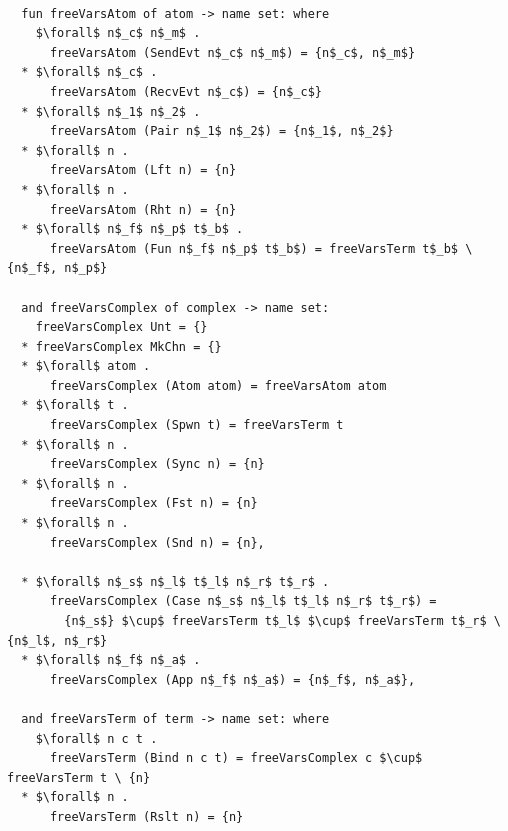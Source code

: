 \documentclass[letterpaper, 11pt]{extarticle}
\begin{document}
\begin{lstlisting}[language=logic, mathescape]

  fun freeVarsAtom of atom -> name set: where
    $\forall$ n$_c$ n$_m$ .
      freeVarsAtom (SendEvt n$_c$ n$_m$) = {n$_c$, n$_m$}
  * $\forall$ n$_c$ .
      freeVarsAtom (RecvEvt n$_c$) = {n$_c$}
  * $\forall$ n$_1$ n$_2$ .
      freeVarsAtom (Pair n$_1$ n$_2$) = {n$_1$, n$_2$}
  * $\forall$ n .
      freeVarsAtom (Lft n) = {n}
  * $\forall$ n .
      freeVarsAtom (Rht n) = {n}
  * $\forall$ n$_f$ n$_p$ t$_b$ .
      freeVarsAtom (Fun n$_f$ n$_p$ t$_b$) = freeVarsTerm t$_b$ \ {n$_f$, n$_p$}
  
  and freeVarsComplex of complex -> name set:
    freeVarsComplex Unt = {}
  * freeVarsComplex MkChn = {}
  * $\forall$ atom .
      freeVarsComplex (Atom atom) = freeVarsAtom atom
  * $\forall$ t .
      freeVarsComplex (Spwn t) = freeVarsTerm t
  * $\forall$ n .
      freeVarsComplex (Sync n) = {n}
  * $\forall$ n .
      freeVarsComplex (Fst n) = {n}
  * $\forall$ n .
      freeVarsComplex (Snd n) = {n},

  * $\forall$ n$_s$ n$_l$ t$_l$ n$_r$ t$_r$ .
      freeVarsComplex (Case n$_s$ n$_l$ t$_l$ n$_r$ t$_r$) = 
        {n$_s$} $\cup$ freeVarsTerm t$_l$ $\cup$ freeVarsTerm t$_r$ \ {n$_l$, n$_r$}
  * $\forall$ n$_f$ n$_a$ .
      freeVarsComplex (App n$_f$ n$_a$) = {n$_f$, n$_a$},
  
  and freeVarsTerm of term -> name set: where
    $\forall$ n c t .
      freeVarsTerm (Bind n c t) = freeVarsComplex c $\cup$ freeVarsTerm t \ {n}
  * $\forall$ n .
      freeVarsTerm (Rslt n) = {n}


\end{lstlisting}
\end{document}
